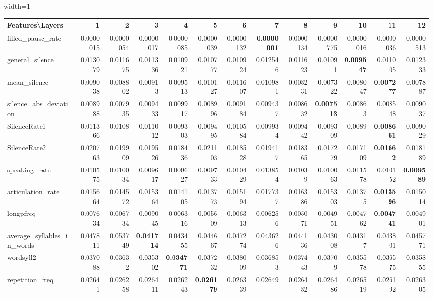 \documentclass[sigconf]{acmart}
\newcommand{\mj}{Mockingjay\xspace}
\begin{document}
\begin{table*}[]
\begin{adjustbox}{width=1\textwidth}
\begin{tabular}{@{}l|rrrrrrrrrrrr@{}}
\toprule
\textbf{Features\textbackslash{}Layers} & 1 & 2 & 3 & 4 & 5 & 6 & 7 & 8 & 9 & 10 & 11 & 12 \\ \midrule
filled\_pause\_rate & 0.0000015 & 0.0000054 & 0.0000017 & 0.0000085 & 0.0000039 & 0.0000132 & \textbf{0.0000001} & 0.0000134 & 0.0000775 & 0.0000016 & 0.0000036 & 0.0000513 \\
general\_silence & 0.013079 & 0.011675 & 0.011336 & 0.010921 & 0.010777 & 0.010924 & 0.012546 & 0.011623 & 0.01091 & \textbf{0.009547} & 0.011005 & 0.012333 \\
mean\_silence & 0.009038 & 0.008802 & 0.00913 & 0.009513 & 0.010127 & 0.011607 & 0.010981 & 0.008231 & 0.007322 & 0.008047 & \textbf{0.007277} & 0.007887 \\
silence\_abs\_deviation & 0.008988 & 0.007935 & 0.009433 & 0.009917 & 0.008996 & 0.009184 & 0.009437 & 0.008632 & \textbf{0.007513} & 0.00863 & 0.008548 & 0.009037 \\
SilenceRate1 & 0.011366 & 0.0108 & 0.011012 & 0.009303 & 0.009495 & 0.010584 & 0.009934 & 0.009442 & 0.009309 & 0.0089 & \textbf{0.008661} & 0.009029 \\
SilenceRate2 & 0.020763 & 0.019909 & 0.019526 & 0.018436 & 0.021103 & 0.018528 & 0.019417 & 0.018365 & 0.017279 & 0.017109 & \textbf{0.01662} & 0.018189 \\
speaking\_rate & 0.010575 & 0.010034 & 0.009617 & 0.009627 & 0.009733 & 0.010429 & 0.013854 & 0.01039 & 0.010063 & 0.011578 & 0.010152 & \textbf{0.009589} \\
articulation\_rate & 0.015664 & 0.014572 & 0.015364 & 0.014105 & 0.013773 & 0.015194 & 0.017737 & 0.016386 & 0.015303 & 0.01375 & \textbf{0.013596} & 0.015014 \\
longpfreq & 0.007634 & 0.006734 & 0.009045 & 0.006316 & 0.005609 & 0.006313 & 0.006256 & 0.005071 & 0.004951 & 0.004762 & \textbf{0.004741} & 0.004901 \\
average\_syllables\_in\_words & 0.047811 & 0.053749 & \textbf{0.041714} & 0.043455 & 0.044667 & 0.047274 & 0.043626 & 0.044136 & 0.043008 & 0.04317 & 0.043801 & 0.045771 \\
wordsyll2 & 0.037088 & 0.03632 & 0.035302 & \textbf{0.034771} & 0.037232 & 0.038009 & 0.036853 & 0.037443 & 0.03709 & 0.035578 & 0.036575 & 0.035855 \\
repetition\_freq & 0.02641 & 0.026258 & 0.026411 & 0.026243 & \textbf{0.026179} & 0.026339 & 0.02649 & 0.026482 & 0.026486 & 0.026519 & 0.026192 & 0.026305 \\ \bottomrule
\end{tabular}
\end{adjustbox}
\vspace{1 mm}
\caption{\label{nFluency_M} \small  Results (MSE) for fluency features on {\mj} for non-native read speech corpus (L2 Arctic)}

\end{table*}
\end{document}
